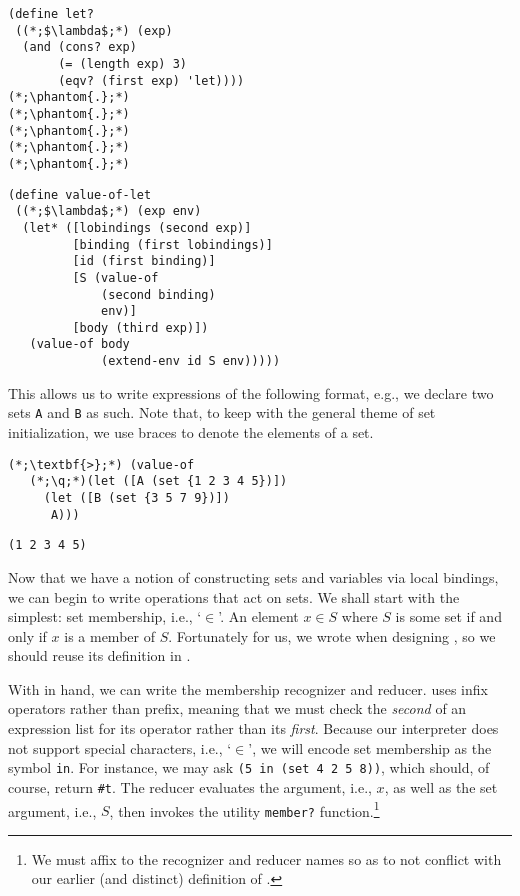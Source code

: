 \begin{clrr}[]{}
\begin{lstlisting}[language=MyScheme]
(define let?
 ((*;$\lambda$;*) (exp)
  (and (cons? exp)
       (= (length exp) 3)
       (eqv? (first exp) 'let))))
(*;\phantom{.};*)
(*;\phantom{.};*)
(*;\phantom{.};*)
(*;\phantom{.};*)
(*;\phantom{.};*)
\end{lstlisting}
\tcblower
\begin{lstlisting}[language=MyNLNScheme]
(define value-of-let
 ((*;$\lambda$;*) (exp env)
  (let* ([lobindings (second exp)]
         [binding (first lobindings)] 
         [id (first binding)]
         [S (value-of 
             (second binding) 
             env)] 
         [body (third exp)])
   (value-of body 
             (extend-env id S env)))))
\end{lstlisting}
\end{clrr}

This allows us to write expressions of the following format, e.g., we declare two sets \texttt{A} and \texttt{B} as such. Note that, to keep with the general theme of set initialization, we use braces to denote the elements of a set. 

\begin{cloast}[]{}
\begin{lstlisting}[language=MyNLNSOutput]
(*;\textbf{>};*) (value-of 
   (*;\q;*)(let ([A (set {1 2 3 4 5})])
     (let ([B (set {3 5 7 9})])
      A)))
\end{lstlisting}
\tcblower
\begin{lstlisting}[language=MyOutput]
(1 2 3 4 5)
\end{lstlisting}
\end{cloast}

Now that we have a notion of constructing sets and variables via local bindings, we can begin to write operations that act on sets. We shall start with the simplest: set membership, i.e., `$\in$'. An element $x \in S$ where $S$ is some set if and only if $x$ is a member of $S$. Fortunately for us, we wrote  when designing , so we should reuse its definition in .

With  in hand, we can write the membership recognizer and reducer.  uses infix operators rather than prefix, meaning that we must check the \textit{second} of an expression list for its operator rather than its \textit{first}. Because our interpreter does not support special characters, i.e., `$\in$', we will encode set membership as the symbol \texttt{in}. For instance, we may ask \texttt{\textquotesingle(5 in (set {4 2 5 8}))}, which should, of course, return \texttt{\#t}. The reducer evaluates the argument, i.e., $x$, as well as the set argument, i.e., $S$, then invokes the utility \texttt{member?} function.\footnote{We must affix  to the recognizer and reducer names so as to not conflict with our earlier (and distinct) definition of .}

